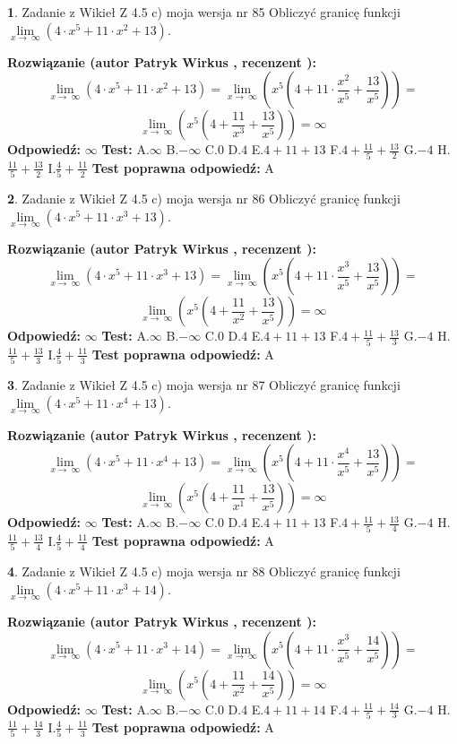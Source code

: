 \documentclass[12pt, a4paper]{article}
\theoremstyle{definition} %
\newtheorem{zad}{}
\newcommand{\zadStart}[1]{\begin{zad}#1\newline}
\newcommand{\zadStop}{\end{zad}}
\newcommand{\rozwStart}[2]{\noindent \textbf{Rozwiązanie (autor #1 , recenzent #2): }\newline}
\newcommand{\rozwStop}{\newline}
\newcommand{\odpStart}{\noindent \textbf{Odpowiedź:}\newline}
\newcommand{\odpStop}{\newline}
\newcommand{\testStart}{\noindent \textbf{Test:}\newline}
\newcommand{\testStop}{\newline}
\newcommand{\kluczStart}{\noindent \textbf{Test poprawna odpowiedź:}\newline}
\newcommand{\kluczStop}{\newline}
\begin{document}
\zadStart{Zadanie z Wikieł Z 4.5 c) moja wersja nr 85}
Obliczyć granicę funkcji  $\lim\limits_{x\to\ \infty}(4 \cdot x^{5}+11 \cdot x^{2}+13)$.
\zadStop
\rozwStart{Patryk Wirkus}{}
$$\lim\limits_{x\to\ \infty}(4 \cdot x^{5}+11 \cdot x^{2}+13) = \lim\limits_{x\to\ \infty}(x^{5}(4 +11 \cdot \frac{x^{2}}{x^{5}}+\frac{13}{x^{5}})) =$$ $$\lim\limits_{x\to\ \infty}(x^{5}(4 +\frac{11}{x^{3}}+\frac{13}{x^{5}})) =\infty$$
\rozwStop
\odpStart
$\infty$
\odpStop
\testStart
A.$\infty$ B.$-\infty$ C.$0$ D.$4$ E.$4 + 11 + 13$
F.$4+\frac{11}{5}+\frac{13}{2}$ G.$-4$
H.$\frac{11}{5}+\frac{13}{2}$
I.$\frac{4}{5}+\frac{11}{2}$
\testStop
\kluczStart
A
\kluczStop



\zadStart{Zadanie z Wikieł Z 4.5 c) moja wersja nr 86}
Obliczyć granicę funkcji  $\lim\limits_{x\to\ \infty}(4 \cdot x^{5}+11 \cdot x^{3}+13)$.
\zadStop
\rozwStart{Patryk Wirkus}{}
$$\lim\limits_{x\to\ \infty}(4 \cdot x^{5}+11 \cdot x^{3}+13) = \lim\limits_{x\to\ \infty}(x^{5}(4 +11 \cdot \frac{x^{3}}{x^{5}}+\frac{13}{x^{5}})) =$$ $$\lim\limits_{x\to\ \infty}(x^{5}(4 +\frac{11}{x^{2}}+\frac{13}{x^{5}})) =\infty$$
\rozwStop
\odpStart
$\infty$
\odpStop
\testStart
A.$\infty$ B.$-\infty$ C.$0$ D.$4$ E.$4 + 11 + 13$
F.$4+\frac{11}{5}+\frac{13}{3}$ G.$-4$
H.$\frac{11}{5}+\frac{13}{3}$
I.$\frac{4}{5}+\frac{11}{3}$
\testStop
\kluczStart
A
\kluczStop



\zadStart{Zadanie z Wikieł Z 4.5 c) moja wersja nr 87}
Obliczyć granicę funkcji  $\lim\limits_{x\to\ \infty}(4 \cdot x^{5}+11 \cdot x^{4}+13)$.
\zadStop
\rozwStart{Patryk Wirkus}{}
$$\lim\limits_{x\to\ \infty}(4 \cdot x^{5}+11 \cdot x^{4}+13) = \lim\limits_{x\to\ \infty}(x^{5}(4 +11 \cdot \frac{x^{4}}{x^{5}}+\frac{13}{x^{5}})) =$$ $$\lim\limits_{x\to\ \infty}(x^{5}(4 +\frac{11}{x^{1}}+\frac{13}{x^{5}})) =\infty$$
\rozwStop
\odpStart
$\infty$
\odpStop
\testStart
A.$\infty$ B.$-\infty$ C.$0$ D.$4$ E.$4 + 11 + 13$
F.$4+\frac{11}{5}+\frac{13}{4}$ G.$-4$
H.$\frac{11}{5}+\frac{13}{4}$
I.$\frac{4}{5}+\frac{11}{4}$
\testStop
\kluczStart
A
\kluczStop



\zadStart{Zadanie z Wikieł Z 4.5 c) moja wersja nr 88}
Obliczyć granicę funkcji  $\lim\limits_{x\to\ \infty}(4 \cdot x^{5}+11 \cdot x^{3}+14)$.
\zadStop
\rozwStart{Patryk Wirkus}{}
$$\lim\limits_{x\to\ \infty}(4 \cdot x^{5}+11 \cdot x^{3}+14) = \lim\limits_{x\to\ \infty}(x^{5}(4 +11 \cdot \frac{x^{3}}{x^{5}}+\frac{14}{x^{5}})) =$$ $$\lim\limits_{x\to\ \infty}(x^{5}(4 +\frac{11}{x^{2}}+\frac{14}{x^{5}})) =\infty$$
\rozwStop
\odpStart
$\infty$
\odpStop
\testStart
A.$\infty$ B.$-\infty$ C.$0$ D.$4$ E.$4 + 11 + 14$
F.$4+\frac{11}{5}+\frac{14}{3}$ G.$-4$
H.$\frac{11}{5}+\frac{14}{3}$
I.$\frac{4}{5}+\frac{11}{3}$
\testStop
\kluczStart
A
\kluczStop
\end{document}
